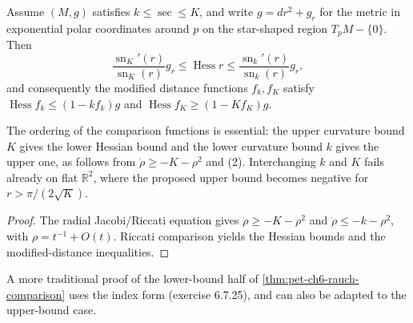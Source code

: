 \begin{theorem}
  \label{thm:pet-ch6-rauch-comparison}
  Assume $(M,g)$ satisfies $k\le\sec\le K$, and write $g=dr^2+g_r$ for the
  metric in exponential polar coordinates around $p$ on the star-shaped
  region $T_pM-\{0\}$. Then
  \[
    \frac{\operatorname{sn}_K'(r)}{\operatorname{sn}_K(r)}g_r\le\operatorname{Hess}r\le\frac{\operatorname{sn}_k'(r)}{\operatorname{sn}_k(r)}g_r,
  \]
  and consequently the modified distance functions $f_k,f_K$ satisfy
  $\operatorname{Hess}f_k\le(1-kf_k)g$ and $\operatorname{Hess}f_K\ge(1-Kf_K)g$.

  The ordering of the comparison functions is essential: the upper curvature
  bound $K$ gives the lower Hessian bound and the lower curvature bound $k$ gives
  the upper one, as follows from
  $\dot\rho\ge-K-\rho^2$ and
  (2). Interchanging $k$ and $K$
  fails already on flat $\mathbb{R}^2$, where the proposed upper bound becomes
  negative for $r>\pi/(2\sqrt K)$.
\end{theorem}
\begin{proof}
  \sketch
  The radial Jacobi/Riccati equation gives \(\dot\rho\ge-K-\rho^2\) and \(\dot\rho\le-k-\rho^2\), with \(\rho=t^{-1}+O(t)\). Riccati comparison yields the Hessian bounds and the modified-distance inequalities.
\end{proof}

\begin{remark}
  \label{rem:pet-ch6-index-form-remark}
  A more traditional proof of the lower-bound half of
  \cref{thm:pet-ch6-rauch-comparison} uses the index form (exercise 6.7.25),
  and can also be adapted to the upper-bound case.
\end{remark}


